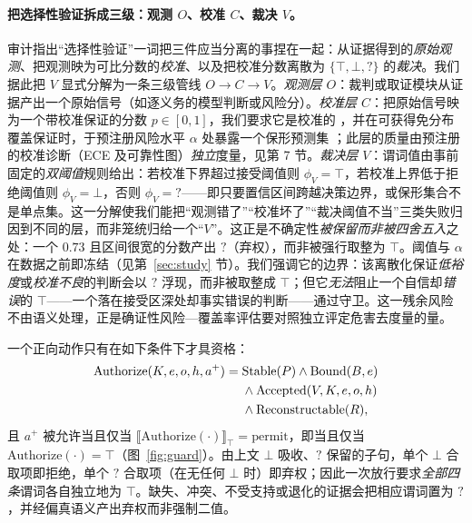 \documentclass[11pt]{ctexart}
\begin{document}
\paragraph{把选择性验证拆成三级：观测 $O$、校准 $C$、裁决 $V$。} 审计指出“选择性验证”一词把三件应当分离的事捏在一起：从证据得到的\emph{原始观测}、把观测映为可比分数的\emph{校准}、以及把校准分数离散为 $\{\top,\bot,?\}$ 的\emph{裁决}。我们据此把 $V$ 显式分解为一条三级管线 $O\to C\to V$。\emph{观测层 $O$}：裁判或取证模块从证据产出一个原始信号（如逐义务的模型判断或风险分）。\emph{校准层 $C$}：把原始信号映为一个带校准保证的分数 $p\in[0,1]$，我们要求它是校准的 \cite{guo2017calibration}，并在可获得免分布覆盖保证时，于预注册风险水平 $\alpha$ 处暴露一个保形预测集 \cite{vovk2005algorithmic,angelopoulos2023conformal}；此层的质量由预注册的校准诊断（ECE 及可靠性图）\emph{独立}度量，见第 7 节。\emph{裁决层 $V$}：谓词值由事前固定的\emph{双阈值}规则给出：若校准下界超过接受阈值则 $\phi_V=\top$，若校准上界低于拒绝阈值则 $\phi_V=\bot$，否则 $\phi_V={?}$——即只要置信区间跨越决策边界，或保形集合不是单点集。这一分解使我们能把“观测错了”“校准坏了”“裁决阈值不当”三类失败归因到不同的层，而非笼统归给一个“$V$”。这正是不确定性\emph{被保留而非被四舍五入}之处：一个 $0.73$ 且区间很宽的分数产出 $?$（弃权），而非被强行取整为 $\top$。阈值与 $\alpha$ 在数据之前即冻结（见第~\ref{sec:study} 节）。我们强调它的边界：该离散化保证\emph{低裕度}或\emph{校准不良}的判断会以 $?$ 浮现，而非被取整成 $\top$；但它\emph{无法}阻止一个自信却\emph{错误}的 $\top$——一个落在接受区深处却事实错误的判断——通过守卫。这一残余风险不由语义处理，正是确证性风险—覆盖率评估要对照独立评定危害去度量的量。

一个正向动作只有在如下条件下才具资格：
\begin{align}
\mathrm{Authorize}(K,e,o,h,a^+)={}&\mathrm{Stable}(P)\land\mathrm{Bound}(B,e)\notag\\
&\land\mathrm{Accepted}(V,K,e,o,h)\notag\\
&\land\mathrm{Reconstructable}(R),
\end{align}
且 $a^+$ 被允许当且仅当 $\llbracket\mathrm{Authorize}(\cdot)\rrbracket_\top=\text{permit}$，即当且仅当 $\mathrm{Authorize}(\cdot)=\top$（图~\ref{fig:guard}）。由上文 $\bot$ 吸收、$?$ 保留的子句，单个 $\bot$ 合取项即拒绝，单个 $?$ 合取项（在无任何 $\bot$ 时）即弃权；因此一次放行要求\emph{全部四条}谓词各自独立地为 $\top$。缺失、冲突、不受支持或退化的证据会把相应谓词置为 $?$，并经偏真语义产出弃权而非强制二值。
\end{document}

